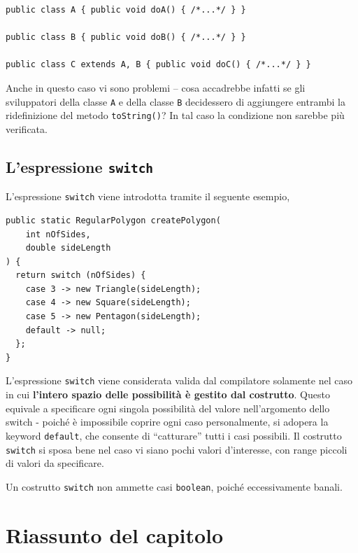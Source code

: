 \documentclass[\fontsizeclass,twocolumn]{\classname}
\theoremstyle{definition}
\theoremstyle{definition}
\begin{document}
\begin{lstlisting}
public class A { public void doA() { /*...*/ } }

public class B { public void doB() { /*...*/ } }

public class C extends A, B { public void doC() { /*...*/ } }
\end{lstlisting}

Anche in questo caso vi sono problemi \--- cosa accadrebbe infatti se gli
sviluppatori della classe \texttt{A} e della classe \texttt{B} decidessero di
aggiungere entrambi la ridefinizione del metodo \texttt{toString()}? In tal
caso la condizione non sarebbe più verificata.

\subsection{L'espressione \texttt{switch}}

L'espressione \texttt{switch} viene introdotta tramite il seguente esempio,

\begin{lstlisting}
public static RegularPolygon createPolygon(
    int nOfSides,
    double sideLength
) {
  return switch (nOfSides) {
    case 3 -> new Triangle(sideLength);
    case 4 -> new Square(sideLength);
    case 5 -> new Pentagon(sideLength);
    default -> null;
  };
}
\end{lstlisting}

L'espressione \texttt{switch} viene considerata valida dal compilatore
solamente nel caso in cui \textbf{l'intero spazio delle possibilità è gestito dal
costrutto}. Questo equivale a specificare ogni singola possibilità del valore
nell'argomento dello switch \-- poiché è impossibile coprire ogni caso
personalmente, si adopera la keyword \texttt{default}, che consente di
``catturare'' tutti i casi possibili. 
Il costrutto \texttt{switch} si sposa bene nel caso vi siano pochi valori
d'interesse, con range piccoli di valori da specificare.

Un costrutto \texttt{switch} non ammette casi \texttt{boolean}, poiché
eccessivamente banali.

\section{Riassunto del capitolo}
\end{document}
